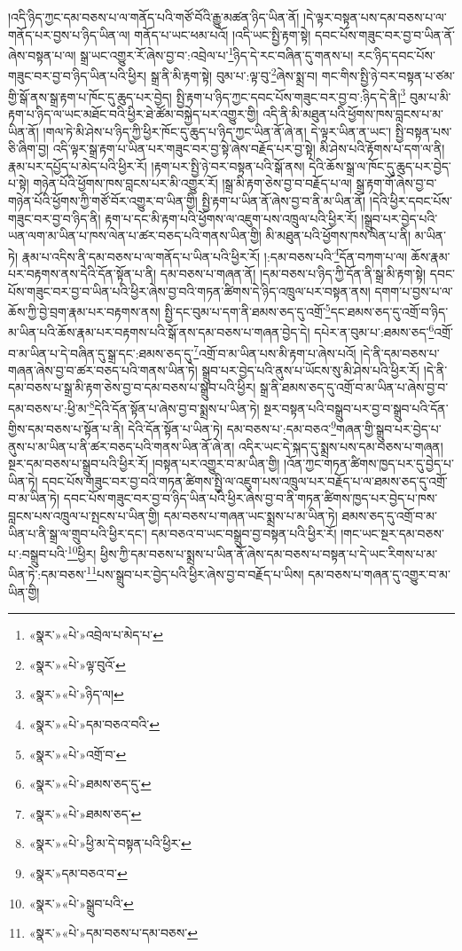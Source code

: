 །འདི་ཉིད་ཀྱང་དམ་བཅས་པ་ལ་གནོད་པའི་གཙོ་བོའི་རྒྱུ་མཚན་ཉིད་ཡིན་ནོ། །དེ་ལྟར་བསྟན་པས་དམ་བཅས་པ་ལ་གནོད་པར་བྱས་པ་ཉིད་ཡིན་ལ། གནོད་པ་ཡང་ཕམ་པའོ། །འདི་ཡང་སྤྱི་རྟག་སྟེ། དབང་པོས་གཟུང་བར་བྱ་བ་ཡིན་ནོ་ཞེས་བསྟན་པ་ལ། སྒྲ་ཡང་འགྱུར་རོ་ཞེས་བྱ་བ་:འབྲེལ་པ་\footnote{«སྣར་»«པེ་»འབྲེལ་པ་མེད་པ་}ཉིད་དེ་རང་བཞིན་དུ་གནས་པ། རང་ཉིད་དབང་པོས་གཟུང་བར་བྱ་བ་ཉིད་ཡིན་པའི་ཕྱིར། སྒྲ་ནི་མི་རྟག་སྟེ། བུམ་པ་:ལྟ་བུ་\footnote{«སྣར་»«པེ་»ལྟ་བུའོ་}ཞེས་སྨྲ་བ། གང་གིས་སྤྱི་ཉེ་བར་བསྟན་པ་ཙམ་གྱི་སྒོ་ནས་སྒྲ་རྟག་པ་ཁོང་དུ་ཆུད་པར་བྱེད། སྤྱི་རྟག་པ་ཉིད་ཀྱང་དབང་པོས་གཟུང་བར་བྱ་བ་:ཉིད་དེ་ནི།\footnote{«སྣར་»«པེ་»ཉིད་ལ།} བུམ་པ་མི་རྟག་པ་ཉིད་ལ་ཡང་མཐོང་བའི་ཕྱིར་ཐེ་ཚོམ་བསྐྱེད་པར་འགྱུར་གྱི། འདི་ནི་མི་མཐུན་པའི་ཕྱོགས་ཁས་བླངས་པ་མ་ཡིན་ནོ། །གལ་ཏེ་མི་ཤེས་པ་ཉིད་ཀྱི་ཕྱིར་ཁོང་དུ་ཆུད་པ་ཉིད་ཀྱང་ཡིན་ནོ་ཞེ་ན། དེ་ལྟར་ཡིན་ན་ཡང་། སྤྱི་བསྟན་པས་ཅི་ཞིག་བྱ། འདི་ལྟར་སྒྲ་རྟག་པ་ཡིན་པར་གཟུང་བར་བྱ་སྟེ་ཞེས་བརྗོད་པར་བྱ་སྟེ། མི་ཤེས་པའི་རྟོགས་པ་དག་ལ་ནི། རྣམ་པར་དཔྱོད་པ་མེད་པའི་ཕྱིར་རོ། །རྟག་པར་སྤྱི་ཉེ་བར་བསྟན་པའི་སྒོ་ནས། དེའི་ཆོས་སྒྲ་ལ་ཁོང་དུ་ཆུད་པར་བྱེད་པ་སྟེ། གཉེན་པོའི་ཕྱོགས་ཁས་བླངས་པར་མི་འགྱུར་རོ། །སྒྲ་མི་རྟག་ཅེས་བྱ་བ་བརྗོད་པ་ལ། སྒྲ་རྟག་གོ་ཞེས་བྱ་བ་གཉེན་པོའི་ཕྱོགས་ཀྱི་གཙོ་བོར་འགྱུར་བ་ཡིན་གྱི། སྤྱི་རྟག་པ་ཡིན་ནོ་ཞེས་བྱ་བ་ནི་མ་ཡིན་ནོ། །དེའི་ཕྱིར་དབང་པོས་གཟུང་བར་བྱ་བ་ཉིད་ནི། རྟག་པ་དང་མི་རྟག་པའི་ཕྱོགས་ལ་འཇུག་པས་འཁྲུལ་པའི་ཕྱིར་རོ། །སྒྲུབ་པར་བྱེད་པའི་ཡན་ལག་མ་ཡིན་པ་ཁས་ལེན་པ་ཚར་བཅད་པའི་གནས་ཡིན་གྱི། མི་མཐུན་པའི་ཕྱོགས་ཁས་ལེན་པ་ནི། མ་ཡིན་ཏེ། རྣམ་པ་འདིས་ནི་དམ་བཅས་པ་ལ་གནོད་པ་ཡིན་པའི་ཕྱིར་རོ། །:དམ་བཅས་པའི་\footnote{«སྣར་»«པེ་»དམ་བཅའ་བའི་}དོན་བཀག་པ་ལ། ཆོས་རྣམ་པར་བརྟགས་ནས་དེའི་དོན་སྟོན་པ་ནི། དམ་བཅས་པ་གཞན་ནོ། །དམ་བཅས་པ་ཉིད་ཀྱི་དོན་ནི་སྒྲ་མི་རྟག་སྟེ། དབང་པོས་གཟུང་བར་བྱ་བ་ཡིན་པའི་ཕྱིར་ཞེས་བྱ་བའི་གཏན་ཚིགས་དེ་ཉིད་འཁྲུལ་པར་བསྟན་ནས། དགག་པ་བྱས་པ་ལ་ཆོས་ཀྱི་བྱེ་བྲག་རྣམ་པར་བརྟགས་ནས། སྤྱི་དང་བུམ་པ་དག་ནི་ཐམས་ཅད་དུ་འགྲོ་\footnote{«སྣར་»«པེ་»འགྲོ་བ་}དང་ཐམས་ཅད་དུ་འགྲོ་བ་ཉིད་མ་ཡིན་པའི་ཆོས་རྣམ་པར་བརྟགས་པའི་སྒོ་ནས་དམ་བཅས་པ་གཞན་བྱེད་དེ། དཔེར་ན་བུམ་པ་:ཐམས་ཅད་\footnote{«སྣར་»«པེ་»ཐམས་ཅད་དུ་}འགྲོ་བ་མ་ཡིན་པ་དེ་བཞིན་དུ་སྒྲ་དང་:ཐམས་ཅད་དུ་\footnote{«སྣར་»«པེ་»ཐམས་ཅད་}འགྲོ་བ་མ་ཡིན་པས་མི་རྟག་པ་ཞེས་པའོ། །དེ་ནི་དམ་བཅས་པ་གཞན་ཞེས་བྱ་བ་ཚར་བཅད་པའི་གནས་ཡིན་ཏེ། སྒྲུབ་པར་བྱེད་པའི་ནུས་པ་ཡོངས་སུ་མི་ཤེས་པའི་ཕྱིར་རོ། །དེ་ནི་དམ་བཅས་པ་སྒྲ་མི་རྟག་ཅེས་བྱ་བ་དམ་བཅས་པ་སྒྲུབ་པའི་ཕྱིར། སྒྲ་ནི་ཐམས་ཅད་དུ་འགྲོ་བ་མ་ཡིན་པ་ཞེས་བྱ་བ་དམ་བཅས་པ་:ཕྱི་མ་\footnote{«སྣར་»«པེ་»ཕྱི་མ་དེ་བསྟན་པའི་ཕྱིར་}དེའི་དོན་སྟོན་པ་ཞེས་བྱ་བ་སྨྲས་པ་ཡིན་ཏེ། སྔར་བསྟན་པའི་བསྒྲུབ་པར་བྱ་བ་སྒྲུབ་པའི་དོན་གྱིས་དམ་བཅས་པ་སྟོན་པ་ནི། དེའི་དོན་སྟོན་པ་ཡིན་ཏེ། དམ་བཅས་པ་:དམ་བཅའ་\footnote{«སྣར་»དམ་བཅའ་བ་}གཞན་གྱི་སྒྲུབ་པར་བྱེད་པ་ནུས་པ་མ་ཡིན་པ་ནི་ཚར་བཅད་པའི་གནས་ཡིན་ནོ་ཞེ་ན། འདིར་ཡང་དེ་སྐད་དུ་སྨྲས་པས་དམ་བཅས་པ་གཞན། སྔར་དམ་བཅས་པ་སྒྲུབ་པའི་ཕྱིར་རོ། །བསྟན་པར་འགྱུར་བ་མ་ཡིན་གྱི། །འོན་ཀྱང་གཏན་ཚིགས་ཁྱད་པར་དུ་བྱེད་པ་ཡིན་ཏེ། དབང་པོས་གཟུང་བར་བྱ་བའི་གཏན་ཚིགས་སྤྱི་ལ་འཇུག་པས་འཁྲུལ་པར་བརྗོད་པ་ལ་ཐམས་ཅད་དུ་འགྲོ་བ་མ་ཡིན་ཏེ། དབང་པོས་གཟུང་བར་བྱ་བ་ཉིད་ཡིན་པའི་ཕྱིར་ཞེས་བྱ་བ་ནི་གཏན་ཚིགས་ཁྱད་པར་བྱེད་པ་ཁས་བླངས་པས་འཁྲུལ་པ་སྤངས་པ་ཡིན་གྱི། དམ་བཅས་པ་གཞན་ཡང་སྨྲས་པ་མ་ཡིན་ཏེ། ཐམས་ཅད་དུ་འགྲོ་བ་མ་ཡིན་པ་ནི་སྒྲ་ལ་གྲུབ་པའི་ཕྱིར་དང་། དམ་བཅའ་བ་ཡང་བསྒྲུབ་བྱ་བསྟན་པའི་ཕྱིར་རོ། །གང་ཡང་སྔར་དམ་བཅས་པ་:བསྒྲུབ་པའི་\footnote{«སྣར་»«པེ་»སྒྲུབ་པའི་}ཕྱིར། ཕྱིས་ཀྱི་དམ་བཅས་པ་སྨྲས་པ་ཡིན་ནོ་ཞེས་དམ་བཅས་པ་བསྟན་པ་དེ་ཡང་རིགས་པ་མ་ཡིན་ཏེ་:དམ་བཅས་\footnote{«སྣར་»«པེ་»དམ་བཅས་པ་དམ་བཅས་}པས་སྒྲུབ་པར་བྱེད་པའི་ཕྱིར་ཞེས་བྱ་བ་བརྗོད་པ་ཡིས། དམ་བཅས་པ་གཞན་དུ་འགྱུར་བ་མ་ཡིན་གྱི། 